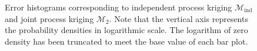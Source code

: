 \documentclass[article,ij4uq]{ij4uq}              %
\begin{document}
\begin{figure}[!t]
\centering
{}
  \caption{Error histograms corresponding to independent process kriging $\mathcal{M}_{\mathrm{ind}}$ and joint process kriging $\mathcal{M}_{2}$. Note that the vertical axis represents the probability densities in logarithmic scale. The logarithm of zero density has been truncated to meet the base value of each bar plot.}\label{fig:6}
\end{figure}
\end{document}
